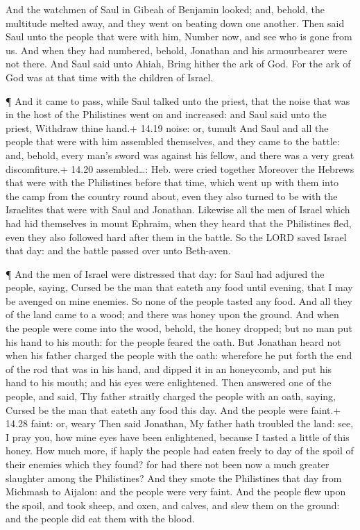  And the watchmen of Saul in Gibeah of Benjamin looked;
and, behold, the multitude melted away, and they went on beating down
one another.  Then said Saul unto the people that were with
him, Number now, and see who is gone from us. And when they had
numbered, behold, Jonathan and his armourbearer were not there.
 And Saul said unto Ahiah, Bring hither the ark of God. For
the ark of God was at that time with the children of Israel.

 ¶ And it came to pass, while Saul talked unto the priest,
that the noise that was in the host of the Philistines went on and
increased: and Saul said unto the priest, Withdraw thine hand.+ 14.19
noise: or, tumult  And Saul and all the people that were
with him assembled themselves, and they came to the battle: and, behold,
every man's sword was against his fellow, and there was a very great
discomfiture.+ 14.20 assembled\ldots: Heb. were cried together
 Moreover the Hebrews that were with the Philistines before
that time, which went up with them into the camp from the country round
about, even they also turned to be with the Israelites that were with
Saul and Jonathan.  Likewise all the men of Israel which
had hid themselves in mount Ephraim, when they heard that the
Philistines fled, even they also followed hard after them in the battle.
 So the LORD saved Israel that day: and the battle passed
over unto Beth-aven.

 ¶ And the men of Israel were distressed that day: for Saul
had adjured the people, saying, Cursed be the man that eateth any food
until evening, that I may be avenged on mine enemies. So none of the
people tasted any food.  And all they of the land came to a
wood; and there was honey upon the ground.  And when the
people were come into the wood, behold, the honey dropped; but no man
put his hand to his mouth: for the people feared the oath. 
But Jonathan heard not when his father charged the people with the oath:
wherefore he put forth the end of the rod that was in his hand, and
dipped it in an honeycomb, and put his hand to his mouth; and his eyes
were enlightened.  Then answered one of the people, and
said, Thy father straitly charged the people with an oath, saying,
Cursed be the man that eateth any food this day. And the people were
faint.+ 14.28 faint: or, weary  Then said Jonathan, My
father hath troubled the land: see, I pray you, how mine eyes have been
enlightened, because I tasted a little of this honey.  How
much more, if haply the people had eaten freely to day of the spoil of
their enemies which they found? for had there not been now a much
greater slaughter among the Philistines?  And they smote
the Philistines that day from Michmash to Aijalon: and the people were
very faint.  And the people flew upon the spoil, and took
sheep, and oxen, and calves, and slew them on the ground: and the people
did eat them with the blood.

